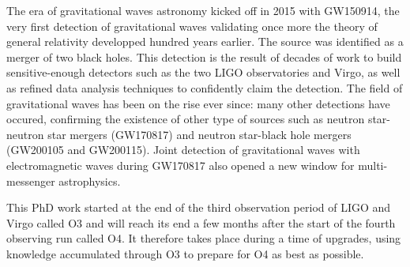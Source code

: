 


The era of gravitational waves astronomy kicked off in 2015 with GW150914, the very first detection of gravitational waves validating once more the theory of general relativity developped hundred years earlier.
The source was identified as a merger of two black holes.
This detection is the result of decades of work to build sensitive-enough detectors such as the two LIGO observatories and Virgo, as well as refined data analysis techniques to confidently claim the detection.
The field of gravitational waves has been on the rise ever since: many other detections have occured, confirming the existence of other type of sources such as neutron star-neutron star mergers (GW170817) and neutron star-black hole mergers (GW200105 and GW200115).
Joint detection of gravitational waves with electromagnetic waves during GW170817 also opened a new window for multi-messenger astrophysics.




This PhD work started at the end of the third observation period of LIGO and Virgo called O3 and will reach its end a few months after the start of the fourth observing run called O4.
It therefore takes place during a time of upgrades, using knowledge accumulated through O3 to prepare for O4 as best as possible.


